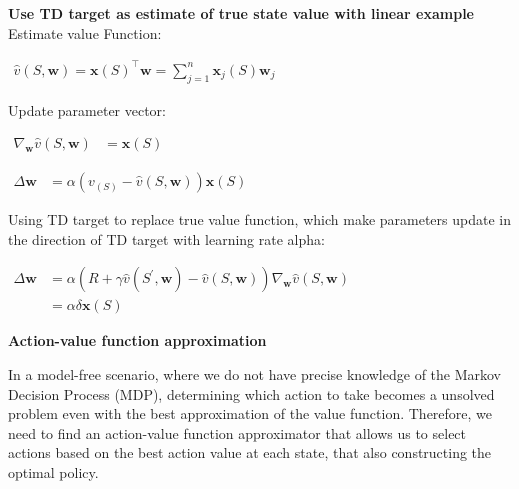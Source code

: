 \documentclass{article}
\begin{document}
\begin{mdframed}[hidealllines=true,backgroundcolor=gray!20]
\textbf{Use TD target as estimate of true state value with linear example}\\

Estimate value Function:
\hspace*{\fill}

$\begin{aligned} \hat{v}(S, \mathbf{w})=\mathbf{x}(S)^{\top} \mathbf{w}=\sum_{j=1}^n \mathbf{x}_j(S) \mathbf{w}_j \end{aligned}$

\hspace*{\fill}

Update parameter vector:

\hspace*{\fill}

$\begin{aligned} \nabla_{\mathbf{w}} \hat{v}(S, \mathbf{w}) & =\mathbf{x}(S) \end{aligned}$

\hspace*{\fill}

$\begin{aligned} \Delta \mathbf{w} & =\alpha\left(v_(S)-\hat{v}(S, \mathbf{w})\right) \mathbf{x}(S)\end{aligned}$

\hspace*{\fill}

Using TD target to replace true value function, which make parameters update in the direction of TD target with learning rate alpha:

\hspace*{\fill}

$\begin{aligned} \Delta \mathbf{w} & =\alpha\left(R+\gamma \hat{v}\left(S^{\prime}, \mathbf{w}\right)-\hat{v}(S, \mathbf{w})\right) \nabla_{\mathbf{w}} \hat{v}(S, \mathbf{w}) \\ & =\alpha \delta \mathbf{x}(S)\end{aligned}$\\


\end{mdframed}

\hspace*{\fill}

\noindent
\textbf{Action-value function approximation}\\
\noindent

In a model-free scenario, where we do not have precise knowledge of the Markov Decision Process (MDP), determining which action to take becomes a unsolved problem even with the best approximation of the value function. Therefore, we need to find an action-value function approximator that allows us to select actions based on the best action value at each state, that also constructing the optimal policy.
\end{document}

